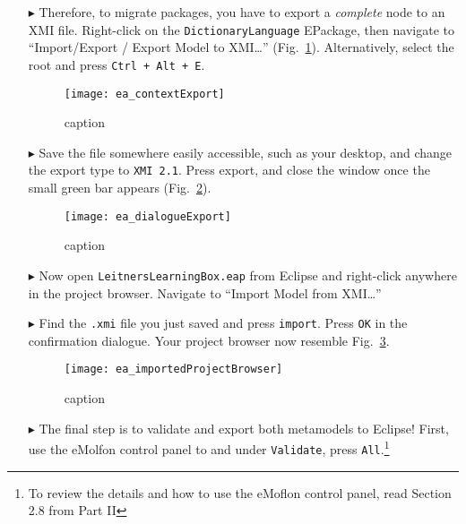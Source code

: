 \begin{itemize}
\clearpage

\item[$\blacktriangleright$] Therefore, to migrate packages, you have to export a \emph{complete} node to an XMI file. Right-click on the
\texttt{DictionaryLanguage} EPackage, then navigate to ``Import/Export / Export Model to XMI\ldots'' (Fig.~\ref{fig:contextExport}). Alternatively, select the
root and press \texttt{Ctrl + Alt + E}.

\begin{figure}[htbp]
\begin{center}
  \texttt{[image: ea\_contextExport]}
  \caption{caption}
  \label{fig:contextExport}
\end{center}
\end{figure}

\item[$\blacktriangleright$] Save the file somewhere easily accessible, such as your desktop, and change the export type to \texttt{XMI 2.1}. Press export,
and close the window once the small green bar appears (Fig.~\ref{fig:export}).

\vspace{0.5cm}

\begin{figure}[htbp]
\begin{center}
  \texttt{[image: ea\_dialogueExport]}
  \caption{caption}
  \label{fig:export}
\end{center}
\end{figure}

\item[$\blacktriangleright$] Now open \texttt{LeitnersLearningBox.eap} from Eclipse and right-click anywhere in the project browser. Navigate to ``Import
Model from XMI\ldots''

\item[$\blacktriangleright$] Find the \texttt{.xmi} file you just saved and press \texttt{import}. Press \texttt{OK} in the confirmation dialogue. Your project
browser now resemble Fig.~\ref{fig:importProBrowser}.

\begin{figure}[htbp]
\begin{center}
  \texttt{[image: ea\_importedProjectBrowser]}
  \caption{caption}
  \label{fig:importProBrowser}
\end{center}
\end{figure}

\item[$\blacktriangleright$] The final step is to validate and export both metamodels to Eclipse! First, use the eMolfon control panel to and under
\texttt{Validate}, press \texttt{All}.\footnote{To review the details and how to use the eMoflon control panel, read Section 2.8 from Part II}


\end{itemize}
